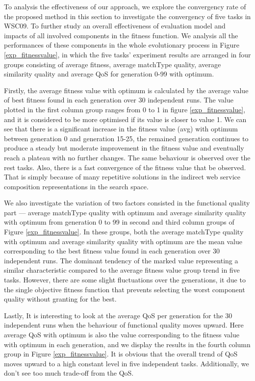 \documentclass{llncs}
\begin{document}
To analysis the effectiveness of our approach, we explore the convergency rate of the proposed method in this section to investigate the convergency of five tasks in WSC09. To further study an overall effectiveness of evaluation model and impacts of all involved components in the fitness function. We analysis all the performances of these components in the whole evolutionary process in Figure \ref{exp_fitnessvalue}, in which the five tasks' experiment results are arranged in four groups consisting of average fitness, average matchType quality, average similarity quality and average QoS for generation 0-99 with optimum.

Firstly, the average fitness value with optimum is calculated by the average value of best fitness found in each generation over 30 independent runs. The value plotted in the first column group ranges from 0 to 1 in figure \ref{exp_fitnessvalue}, and it is considered to be more optimised if its value is closer to value 1. We can see that there is a significant increase in the fitness value (avg) with optimum between generation 0 and generation 15-25, the remained generation continues to produce a steady but moderate improvement in the fitness value and eventually reach a plateau with no further changes. The same behaviour is observed over the rest tasks. Also, there is a fast convergence of the fitness value that be observed. That is simply because of many repetitive solutions in the indirect web service composition representations in the search space.

We also investigate the variation of two factors consisted in the functional quality part --- average matchType quality with optimum and average similarity quality with optimum from generation 0 to 99 in second and third column groups of Figure \ref{exp_fitnessvalue}. In these groups,  both the average matchType quality with optimum and average similarity quality with optimum are the mean value corresponding to the best fitness value found in each generation over 30 independent runs. The dominant tendency of the marked value representing a similar characteristic compared to the average fitness value group trend in five tasks. However, there are some slight fluctuations over the generations, it due to the single objective fitness function that prevents selecting the worst component quality without granting for the best.

Lastly, It is interesting to look at the average QoS per generation for the 30 independent runs when the behaviour of functional quality moves upward. Here average QoS with optimum is also the value corresponding to the fitness value with optimum in each generation, and we display the results in the fourth column group in Figure \ref{exp_fitnessvalue}. It is obvious that the overall trend of QoS moves upward to a high constant level in five independent tasks. Additionally, we don't see too much trade-off from the QoS.
\end{document}
